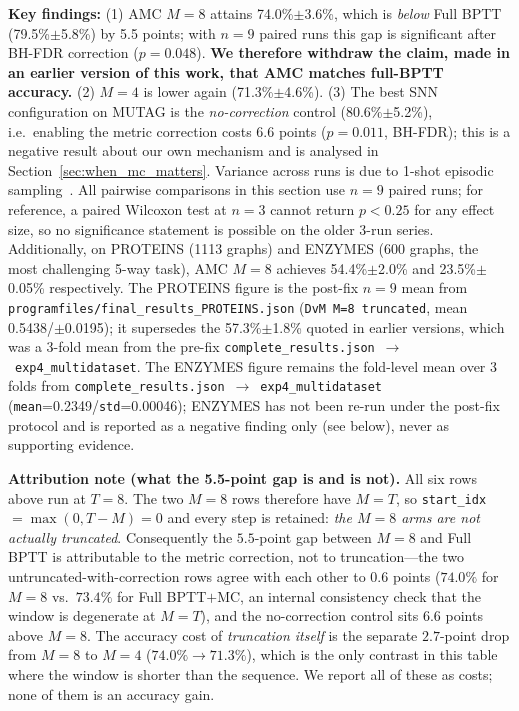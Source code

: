 \documentclass[a4paper,fleqn]{cas-dc}
\begin{document}
\textbf{Key findings:} (1) AMC $M{=}8$ attains 74.0\%$\pm$3.6\%, which is \emph{below} Full BPTT (79.5\%$\pm$5.8\%) by 5.5 points; with $n{=}9$ paired runs this gap is significant after BH-FDR correction ($p{=}0.048$). \textbf{We therefore withdraw the claim, made in an earlier version of this work, that AMC matches full-BPTT accuracy.} (2) $M{=}4$ is lower again (71.3\%$\pm$4.6\%). (3) The best SNN configuration on MUTAG is the \emph{no-correction} control (80.6\%$\pm$5.2\%), i.e.\ enabling the metric correction costs 6.6 points ($p{=}0.011$, BH-FDR); this is a negative result about our own mechanism and is analysed in Section~\ref{sec:when_mc_matters}. Variance across runs is due to 1-shot episodic sampling~\citep{Sun24MSG}. All pairwise comparisons in this section use $n{=}9$ paired runs; for reference, a paired Wilcoxon test at $n{=}3$ cannot return $p<0.25$ for any effect size, so no significance statement is possible on the older 3-run series. Additionally, on PROTEINS (1113 graphs) and ENZYMES (600 graphs, the most challenging 5-way task), AMC $M{=}8$ achieves 54.4\%$\pm$2.0\% and 23.5\%$\pm$0.05\% respectively. The PROTEINS figure is the post-fix $n{=}9$ mean from \texttt{programfiles/final\_results\_PROTEINS.json} (\texttt{DvM M=8 truncated}, mean 0.5438/$\pm$0.0195); it supersedes the 57.3\%$\pm$1.8\% quoted in earlier versions, which was a 3-fold mean from the pre-fix \texttt{complete\_results.json}~$\to$~\texttt{exp4\_multidataset}. The ENZYMES figure remains the fold-level mean over 3 folds from \texttt{complete\_results.json}~$\to$~\texttt{exp4\_multidataset} (\texttt{mean}=0.2349/\texttt{std}=0.00046); ENZYMES has not been re-run under the post-fix protocol and is reported as a negative finding only (see below), never as supporting evidence.

\textbf{Attribution note (what the 5.5-point gap is and is not).} All six rows above run at $T{=}8$. The two $M{=}8$ rows therefore have $M{=}T$, so \texttt{start\_idx}$=\max(0,T-M){=}0$ and every step is retained: \emph{the $M{=}8$ arms are not actually truncated}. Consequently the $5.5$-point gap between $M{=}8$ and Full BPTT is attributable to the metric correction, not to truncation---the two untruncated-with-correction rows agree with each other to $0.6$ points ($74.0\%$ for $M{=}8$ vs.\ $73.4\%$ for Full BPTT$+$MC, an internal consistency check that the window is degenerate at $M{=}T$), and the no-correction control sits $6.6$ points above $M{=}8$. The accuracy cost of \emph{truncation itself} is the separate $2.7$-point drop from $M{=}8$ to $M{=}4$ ($74.0\% \to 71.3\%$), which is the only contrast in this table where the window is shorter than the sequence. We report all of these as costs; none of them is an accuracy gain.
\end{document}
